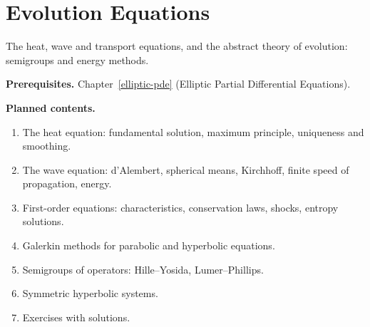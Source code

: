 \chapter{Evolution Equations}\label{evolution-equations}

The heat, wave and transport equations, and the abstract theory of evolution: semigroups and energy
methods.

\noindent\textbf{Prerequisites.} Chapter~\ref{elliptic-pde} (Elliptic Partial Differential Equations).

\noindent\textbf{Planned contents.}
\begin{enumerate}
\item The heat equation: fundamental solution, maximum principle, uniqueness and smoothing.
\item The wave equation: d'Alembert, spherical means, Kirchhoff, finite speed of propagation, energy.
\item First-order equations: characteristics, conservation laws, shocks, entropy solutions.
\item Galerkin methods for parabolic and hyperbolic equations.
\item Semigroups of operators: Hille--Yosida, Lumer--Phillips.
\item Symmetric hyperbolic systems.
\item Exercises with solutions.
\end{enumerate}
